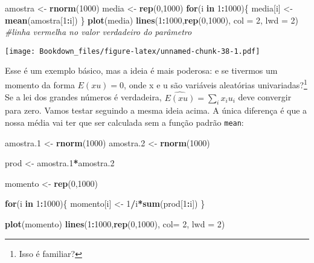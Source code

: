 \documentclass[
]{book}
\newenvironment{Shaded}{\begin{snugshade}}{\end{snugshade}}
\newcommand{\CommentTok}[1]{\textcolor[rgb]{0.56,0.35,0.01}{\textit{#1}}}
\newcommand{\ControlFlowTok}[1]{\textcolor[rgb]{0.13,0.29,0.53}{\textbf{#1}}}
\newcommand{\DataTypeTok}[1]{\textcolor[rgb]{0.13,0.29,0.53}{#1}}
\newcommand{\DecValTok}[1]{\textcolor[rgb]{0.00,0.00,0.81}{#1}}
\newcommand{\FloatTok}[1]{\textcolor[rgb]{0.00,0.00,0.81}{#1}}
\newcommand{\KeywordTok}[1]{\textcolor[rgb]{0.13,0.29,0.53}{\textbf{#1}}}
\newcommand{\NormalTok}[1]{#1}
\newcommand{\OperatorTok}[1]{\textcolor[rgb]{0.81,0.36,0.00}{\textbf{#1}}}
\newcommand{\StringTok}[1]{\textcolor[rgb]{0.31,0.60,0.02}{#1}}
\begin{document}
\begin{Shaded}
\begin{Highlighting}[]
\NormalTok{amostra \textless{}{-}}\StringTok{ }\KeywordTok{rnorm}\NormalTok{(}\DecValTok{1000}\NormalTok{)}
\NormalTok{media \textless{}{-}}\StringTok{ }\KeywordTok{rep}\NormalTok{(}\DecValTok{0}\NormalTok{,}\DecValTok{1000}\NormalTok{)}
\ControlFlowTok{for}\NormalTok{(i }\ControlFlowTok{in} \DecValTok{1}\OperatorTok{:}\DecValTok{1000}\NormalTok{)\{}
\NormalTok{  media[i] \textless{}{-}}\StringTok{ }\KeywordTok{mean}\NormalTok{(amostra[}\DecValTok{1}\OperatorTok{:}\NormalTok{i])}
\NormalTok{\}}
\KeywordTok{plot}\NormalTok{(media)}
\KeywordTok{lines}\NormalTok{(}\DecValTok{1}\OperatorTok{:}\DecValTok{1000}\NormalTok{,}\KeywordTok{rep}\NormalTok{(}\DecValTok{0}\NormalTok{,}\DecValTok{1000}\NormalTok{), }\DataTypeTok{col =} \DecValTok{2}\NormalTok{, }\DataTypeTok{lwd =} \DecValTok{2}\NormalTok{) }\CommentTok{\#linha vermelha no valor verdadeiro do parâmetro}
\end{Highlighting}
\end{Shaded}

\texttt{[image: Bookdown\_files/figure-latex/unnamed-chunk-38-1.pdf]}

Esse é um exemplo básico, mas a ideia é mais poderosa: e se tivermos um momento da forma \(E(xu)=0\), onde x e u são variáveis aleatórias univariadas?\footnote{Isso é familiar?} Se a lei dos grandes números é verdadeira, \(\widehat{E(xu)} = \sum_i x_i u_i\) deve convergir para zero. Vamos testar seguindo a mesma ideia acima. A única diferença é que a nossa média vai ter que ser calculada sem a função padrão \texttt{mean}:

\begin{Shaded}
\begin{Highlighting}[]
\NormalTok{amostra}\FloatTok{.1}\NormalTok{ \textless{}{-}}\StringTok{ }\KeywordTok{rnorm}\NormalTok{(}\DecValTok{1000}\NormalTok{)}
\NormalTok{amostra}\FloatTok{.2}\NormalTok{ \textless{}{-}}\StringTok{ }\KeywordTok{rnorm}\NormalTok{(}\DecValTok{1000}\NormalTok{)}

\NormalTok{prod \textless{}{-}}\StringTok{ }\NormalTok{amostra}\FloatTok{.1}\OperatorTok{*}\NormalTok{amostra}\FloatTok{.2}

\NormalTok{momento \textless{}{-}}\StringTok{ }\KeywordTok{rep}\NormalTok{(}\DecValTok{0}\NormalTok{,}\DecValTok{1000}\NormalTok{)}

\ControlFlowTok{for}\NormalTok{(i }\ControlFlowTok{in} \DecValTok{1}\OperatorTok{:}\DecValTok{1000}\NormalTok{)\{}
\NormalTok{  momento[i] \textless{}{-}}\StringTok{ }\DecValTok{1}\OperatorTok{/}\NormalTok{i}\OperatorTok{*}\KeywordTok{sum}\NormalTok{(prod[}\DecValTok{1}\OperatorTok{:}\NormalTok{i])}
\NormalTok{\}}

\KeywordTok{plot}\NormalTok{(momento)}
\KeywordTok{lines}\NormalTok{(}\DecValTok{1}\OperatorTok{:}\DecValTok{1000}\NormalTok{,}\KeywordTok{rep}\NormalTok{(}\DecValTok{0}\NormalTok{,}\DecValTok{1000}\NormalTok{), }\DataTypeTok{col=} \DecValTok{2}\NormalTok{, }\DataTypeTok{lwd =} \DecValTok{2}\NormalTok{)}
\end{Highlighting}
\end{Shaded}
\end{document}
